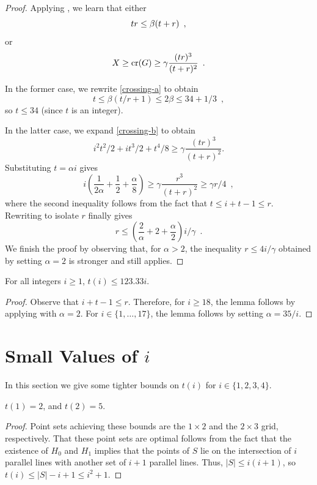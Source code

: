 \documentclass{cccg10}
\DeclareMathOperator{\cn}{cr}
\begin{document}
\begin{proof}
Applying , we learn that either
\begin{equation}
   tr \le \beta (t+r) \enspace , \eqlabel{crossing-a}
\end{equation}
or
\begin{equation}
   X \ge \cn(G) \ge \gamma \frac{(tr)^3}{(t+r)^2} \eqlabel{crossing-b} \enspace .
\end{equation}

In the former case, we rewrite \eqref{crossing-a} to obtain
\[
   t \le \beta(t/r + 1) \le 2\beta \le 34 + 1/3 \enspace ,
\]
so $t\le 34$ (since $t$ is an integer).

In the latter case, we expand \eqref{crossing-b} to obtain
\[ i^2t^2/2 + it^3/2 + t^4/8 \ge \gamma\frac{(tr)^3}{(t+r)^2} .  \]
Substituting $t=\alpha i$ gives
\[ i\left(\frac{1}{2\alpha} 
    + \frac{1}{2}+\frac{\alpha}{8}\right) 
      \ge \gamma \frac{r^3}{(t+r)^2} \ge \gamma r/ 4 \enspace ,
\]
where the second inequality follows from the fact that $t\le i+t-1 \le r$.
Rewriting to isolate $r$ finally gives
\[
  r \le \left(\frac{2}{\alpha} + 2 +\frac{\alpha}{2}\right)i/\gamma \enspace .
\]
We finish the proof by observing that, for $\alpha > 2$, the inequality
$r\le 4i/\gamma$ obtained by setting $\alpha=2$ is stronger and still
applies.
\end{proof}

\begin{lem}
For all integers $i\ge 1$, $t(i) \le 123.33i$.
\end{lem}

\begin{proof}
Observe that $i+t-1\le r$.  Therefore, for $i\ge 18$, the lemma
follows by applying  with $\alpha=2$.
For $i\in\{1,\ldots,17\}$, the lemma follows by setting $\alpha = 35/i$.
\end{proof}

\section{Small Values of $i$}

In this section we give some tighter bounds on $t(i)$ for $i\in\{1,2,3,4\}$.

\begin{lem}
$t(1) = 2$, and $t(2)=5$.
\end{lem}

\begin{proof}
Point sets achieving these bounds are the $1\times 2$ and the $2\times 3$
grid, respectively.  That these point sets are optimal follows from the
fact that the existence of $H_0$ and $H_1$ implies that the points of $S$
lie on the intersection of $i$ parallel lines with another set of $i+1$
parallel lines.  Thus, $|S|\le i(i+1)$, so $t(i) \le |S|-i+1\le i^2+1$.
\end{proof}
\end{document}
